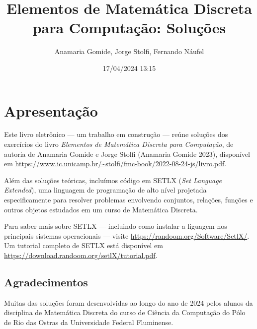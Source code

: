 \documentclass[
  letterpaper,
  DIV=11,
  numbers=noendperiod]{scrreprt}
\title{Elementos de Matemática Discreta para Computação: Soluções}
\author{Anamaria Gomide, Jorge Stolfi, Fernando Náufel}
\date{17/04/2024 13:15}
\renewcommand*\contentsname{Índice}
\newcommand\contentsname{Índice}
\begin{document}
\maketitle

\makeatletter
{}
{}
{}
\makeatother


\renewcommand*\contentsname{Índice}
{
\hypersetup{linkcolor=}
\setcounter{tocdepth}{2}
\tableofcontents
}

\chapter*{Apresentação}\label{apresentauxe7uxe3o}


Este livro eletrônico --- um trabalho em construção --- reúne soluções
dos exercícios do livro \emph{Elementos de Matemática Discreta para
Computação}, de autoria de Anamaria Gomide e Jorge Stolfi (Anamaria
Gomide 2023), disponível em
\url{https://www.ic.unicamp.br/~stolfi/fmc-book/2022-08-24-js/livro.pdf}.

Além das soluções teóricas, incluímos código em SETLX (\emph{Set
Language Extended}), uma linguagem de programação de alto nível
projetada especificamente para resolver problemas envolvendo conjuntos,
relações, funções e outros objetos estudados em um curso de Matemática
Discreta.

Para saber mais sobre SETLX --- incluindo como instalar a liguagem nos
principais sistemas operacionais --- visite
\url{https://randoom.org/Software/SetlX/}. Um tutorial completo de SETLX
está disponível em
\url{https://download.randoom.org/setlX/tutorial.pdf}.

\section*{Agradecimentos}\label{agradecimentos}


Muitas das soluções foram desenvolvidas ao longo do ano de 2024 pelos
alunos da disciplina de Matemática Discreta do curso de Ciência da
Computação do Pólo de Rio das Ostras da Universidade Federal Fluminense.
\end{document}

